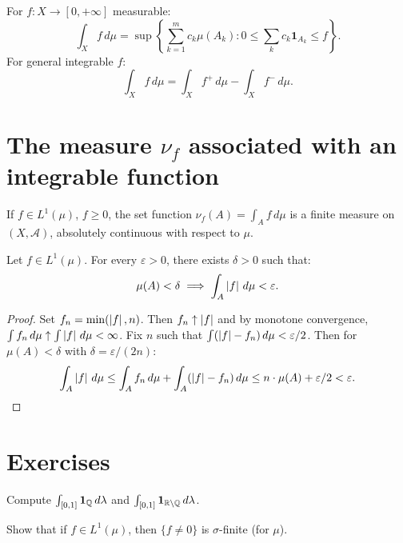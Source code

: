 \begin{keyformulas}[title=\textbf{Lebesgue integral --- Summary}]
For $f : X \to [0, +\infty]$ measurable:
\[
\int_X f\, d\mu = \sup\left\{\sum_{k=1}^m c_k \mu(A_k) :
0 \leq \sum_k c_k \mathbf{1}_{A_k} \leq f\right\}.
\]
For general integrable $f$:
\[
\int_X f\, d\mu = \int_X f^+\, d\mu - \int_X f^-\, d\mu.
\]
\end{keyformulas}

\section{The measure $\nu_f$ associated with an integrable function}

\begin{proposition}
If $f \in L^1(\mu)$, $f \geq 0$, the set function
$\nu_f(A) = \int_A f\, d\mu$ is a finite measure on $(X, \mathcal{A})$, absolutely
continuous with respect to $\mu$.
\end{proposition}

\begin{proposition}
Let $f \in L^1(\mu)$. For every $\varepsilon > 0$, there exists $\delta > 0$ such
that:
\[
\mu(A) < \delta \implies \int_A \left| f \right|\, d\mu < \varepsilon.
\]
\end{proposition}

\begin{proof}
Set $f_n = \min(\left| f \right|, n)$. Then $f_n \uparrow \left| f \right|$ and by monotone
convergence, $\int f_n\, d\mu \uparrow \int \left| f \right|\, d\mu < \infty$. Fix $n$ such
that $\int (\left| f \right| - f_n)\, d\mu < \varepsilon/2$. Then for $\mu(A) < \delta$
with $\delta = \varepsilon/(2n)$:
\[
\int_A \left| f \right|\, d\mu \leq \int_A f_n\, d\mu + \int_A (\left| f \right| - f_n)\, d\mu
\leq n \cdot \mu(A) + \varepsilon/2 < \varepsilon. \qedhere
\]
\end{proof}

\section{Exercises}

\begin{exercise}
Compute $\int_{[0,1]} \mathbf{1}_{\mathbb{Q}}\, d\lambda$ and
$\int_{[0,1]} \mathbf{1}_{\mathbb{R} \setminus \mathbb{Q}}\, d\lambda$.
\end{exercise}

\begin{exercise}
Show that if $f \in L^1(\mu)$, then $\{f \neq 0\}$ is $\sigma$-finite (for $\mu$).
\end{exercise}


